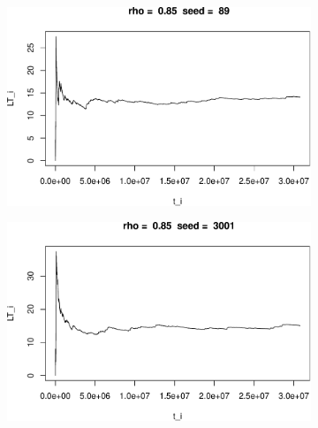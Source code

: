 \documentclass[]{article}
\begin{document}
\begin{figure}[h!]
\begin{subfigure}[b]{.55\linewidth}
\includegraphics[width=\linewidth]{003_files/figure-latex/unnamed-chunk-20-7.pdf}
\end{subfigure}\hfill
\begin{subfigure}[b]{.55\linewidth}
\includegraphics[width=\linewidth]{003_files/figure-latex/unnamed-chunk-20-8.pdf}
\end{subfigure}\vfill
\end{figure}
\end{document}
